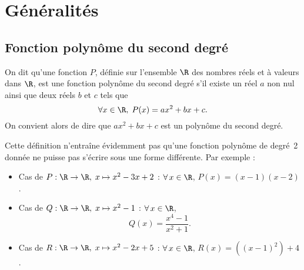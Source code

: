\newcommand{\parafive}{
\begin{tikzpicture}[domain=-5:5,samples=100,x=6mm,y=6mm]
		\clip (-2,-1.5) rectangle (3.5,5);
	\draw[very thin,color=gray,xstep=0.5,ystep=0.5] (-2,-.5) grid (3.5,5);
	\draw [->](-2,0) -- (3.5,0) node[above=25mm,left=6mm] {$\symcal{C}_P$};
	\draw[->] (-1.9,-.5) -- (-1.9,5) node[above] {};
	\draw[semithick,domain=-2:3.5] plot (\x,{(\x+1)*(\x-2)+2.75});
\node[below] at (.75,-.5){$\Delta<0\;\text{ et }\; a>0$};		
	\end{tikzpicture}
}

\newcommand{\parasix}{	
	\begin{tikzpicture}[domain=-5:5,samples=100,x=6mm,y=6mm]
		\clip (-2,-6) rectangle (3.5,0.5);
	\draw[very thin,color=gray,xstep=0.5,ystep=0.5] (-2,-5) grid (3.5,.5);
	\draw [->](-2,0) -- (3.5,0) node[below=25mm,left=6mm] {$\symcal{C}_P$};
	\draw[->] (-1.9,-5) -- (-1.9,.5) node[above] {};
	\draw[semithick,domain=-2:3.5] plot (\x,{-(\x+1)*(\x-2)-2.75});
\draw[fill=white,white] (-2,-6) rectangle (3.5,-5);	
\node[below] at (.75,-5){$\Delta<0\;\text{ et }\; a<0$};	
	\end{tikzpicture}
}
\tgoshorttoc
\section{Généralités}
\subsection{Fonction polynôme du second degré}
On dit qu'une fonction $P$, définie sur l'ensemble $\R$ des nombres réels et à valeurs dans $\R$, est une fonction polynôme du second degré s'il existe un réel $a$ non nul ainsi que deux réels $b$ et $c$ tels que
\[\forall x\in\R,\; P(x)=ax^2+bx+c.\]
On convient alors de dire que $ax^2+bx+c$ est un polynôme du second degré.

\begin{remark}
Cette définition n'entraîne évidemment pas qu'une fonction polynôme de degré 2 donnée ne puisse pas s'écrire sous une forme différente. Par exemple :
\begin{itemize}
\item Cas de $P : \R\rightarrow\R,\; x\mapsto x^2-3x+2$ : $\forall\,x\in\R$, $P(x)=(x-1)(x-2)$.
\item  Cas de $Q : \R\rightarrow\R,\; x\mapsto x^2-1$ : $\forall\,x\in\R$,
 \[Q(x)=\frac{x^4-1}{x^2+1}.\]
 \item Cas de $R : \R\rightarrow\R,\; x\mapsto x^2-2x+5$ : $\forall\,x\in\R$, $R(x)=\left(\left({x-1}\right)^2\right)+4$.
\end{itemize}
\end{remark}
